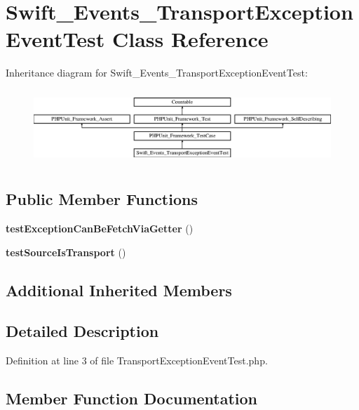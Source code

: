 \section{Swift\+\_\+\+Events\+\_\+\+Transport\+Exception\+Event\+Test Class Reference}
\label{class_swift___events___transport_exception_event_test}
Inheritance diagram for Swift\+\_\+\+Events\+\_\+\+Transport\+Exception\+Event\+Test\+:\begin{figure}[H]
\begin{center}
\leavevmode
\includegraphics[height=2.839037cm]{class_swift___events___transport_exception_event_test}
\end{center}
\end{figure}
\subsection*{Public Member Functions}
\begin{DoxyCompactItemize}
\item 
{\bf test\+Exception\+Can\+Be\+Fetch\+Via\+Getter} ()
\item 
{\bf test\+Source\+Is\+Transport} ()
\end{DoxyCompactItemize}
\subsection*{Additional Inherited Members}


\subsection{Detailed Description}


Definition at line 3 of file Transport\+Exception\+Event\+Test.\+php.



\subsection{Member Function Documentation}
